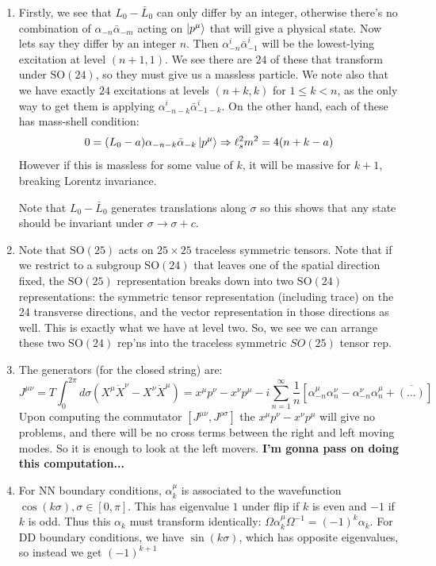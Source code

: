 \documentclass[11pt, class=article, crop=false]{standalone}
\begin{document}
\begin{enumerate}
	 \item Firstly, we see that $L_0 - \bar L_0$ can only differ by an integer, otherwise there's no combination of $\alpha_{-n} \bar \alpha_{-m}$ acting on $\ket{p^\mu}$ that will give a physical state. Now lets say they differ by an integer $n$. Then $\alpha_{-n}^i \bar \alpha_{-1}^i$ will be the lowest-lying excitation at level $(n+1, 1)$. We see there are $24$ of these that transform under $\mathrm{SO}(24)$, so they must give us a massless particle. We note also that we have exactly $24$ excitations at levels $(n+k, k)$ for $1 \leq k < n$, as the only way to get them is applying $\alpha_{-n-k}^i \bar \alpha_{-1-k}^i$. On the other hand, each of these has mass-shell condition:
	 \[
	 	0 = (L_0 - a) \alpha_{-n-k} \bar \alpha_{-k} \ket{p^\mu} \Rightarrow \ell_s^2 m^2 = 4 (n + k - a)
	 \]
	 However if this is massless for some value of $k$, it will be massive for $k+1$, breaking Lorentz invariance. 
	 
	 Note that $L_0 - \bar L_0$ generates translations along $\sigma$ so this shows that any state should be invariant under $\sigma \to \sigma + c$.
	 
	 \item Note that $\mathrm{SO}(25)$ acts on $25 \times 25$ traceless symmetric tensors. Note that if we restrict to a subgroup $\mathrm{SO}(24)$ that leaves one of the spatial direction fixed, the $\mathrm{SO}(25)$ representation breaks down into two $\mathrm{SO}(24)$ representations: the symmetric tensor representation (including trace) on the 24 transverse directions, and the vector representation in those directions as well. This is exactly what we have at level two. So, we see we can arrange these two $\mathrm{SO}(24)$ rep'ns into the traceless symmetric $SO(25)$ tensor rep. 
	 
	 \item The generators (for the closed string) are:
	 \[
	 	J^{\mu \nu} = T \int_0^{2\pi} d\sigma (X^\mu \dot X^\nu - X^\nu \dot X^\mu) = x^\mu p^\nu - x^\nu p^\mu - i \sum_{n=1}^\infty \frac1n [\alpha_{-n}^\mu \alpha^\nu_n - \alpha^\nu_{-n} \alpha^\mu_n + \overline{(\dots)} ]
	 \]
	 Upon computing the commutator $[J^{\mu \nu}, J^{\rho \sigma}]$ the $x^{ \mu} p^{\nu} - x^\nu p^\mu$ will give no problems, and there will be no cross terms between the right and left moving modes. So it is enough to look at the left movers.
	 \textbf{I'm gonna pass on doing this computation...}
	 
	 \item For NN boundary conditions, $\alpha_k^\mu$ is associated to the wavefunction $\cos(k \sigma), \sigma \in [0, \pi]$. This has eigenvalue $1$ under flip if $k$ is even and $-1$ if $k$ is odd. Thus this $\alpha_k$ must transform identically: $\Omega \alpha^\mu_k \Omega^{-1} = (-1)^k \alpha_k$. For DD boundary conditions, we have $\sin(k \sigma)$, which has opposite eigenvalues, so instead we get $(-1)^{k+1}$
	 

\end{enumerate}
\end{document}
